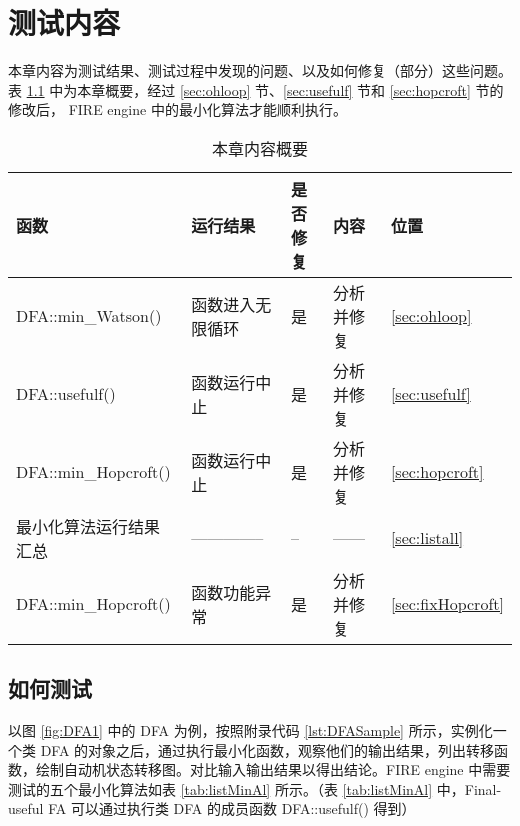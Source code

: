 \chapter{测试内容}\label{cha:realwork}

本章内容为测试结果、测试过程中发现的问题、以及如何修复（部分）这些问题。表 \ref{tab:testerrorlist} 中为本章概要，经过 \ref{sec:ohloop} 节、\ref{sec:usefulf} 节和 \ref{sec:hopcroft} 节的修改后， FIRE engine 中的最小化算法才能顺利执行。

\begin{table}[!htbp]
    \caption{本章内容概要}
    \label{tab:testerrorlist}
    \centering
    \small%
    \setlength{\tabcolsep}{6pt}%
    \renewcommand{\arraystretch}{1.2}%
        \begin{tabular}{l l p{4em}<{\centering} p{5em}<{\centering} p{3em}<{\centering}}
        \toprule %
        函数 & 运行结果 & 是否修复 & 内容 & 位置 \\
        \midrule%
        DFA::min\_Watson() & 函数进入无限循环 & 是 & 分析并修复   & \ref{sec:ohloop} \\
        DFA::usefulf()     & 函数运行中止     & 是 & 分析并修复   & \ref{sec:usefulf} \\
        DFA::min\_Hopcroft() & 函数运行中止   & 是 & 分析并修复   & \ref{sec:hopcroft} \\
        最小化算法运行结果汇总   & --------------   & -- & ------ & \ref{sec:listall}  \\
        DFA::min\_Hopcroft()& 函数功能异常   & 是 & 分析并修复    &  \ref{sec:fixHopcroft} \\
        \bottomrule%
    \end{tabular}
\end{table}

\section{如何测试}

以图 \ref{fig:DFA1} 中的 DFA 为例，按照附录代码 \ref{lst:DFASample} 所示，实例化一个类 DFA 的对象之后，通过执行最小化函数，观察他们的输出结果，列出转移函数，绘制自动机状态转移图。对比输入输出结果以得出结论。FIRE engine 中需要测试的五个最小化算法如表 \ref{tab:listMinAl} 所示。（表 \ref{tab:listMinAl} 中，Final-useful FA 可以通过执行类 DFA 的成员函数 DFA::usefulf() 得到）

